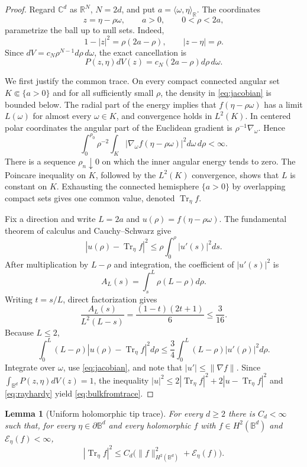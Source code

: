 \documentclass[11pt]{article}
\newtheorem{lemma}{Lemma}
\theoremstyle{remark}
\newcommand{\Bd}{\mathbb B^d}
\newcommand{\Sd}{\partial\mathbb B^d}
\newcommand{\Eeta}{\mathcal E_{\eta}}
\newcommand{\Tr}{\operatorname{Tr}}
\begin{document}
\begin{proof}
Regard $\mathbb C^d$ as $\mathbb R^N$, $N=2d$, and put
$a=\langle\omega,\eta\rangle_{\mathbb R}$.  The coordinates
\[
 z=\eta-\rho\omega,\qquad a>0,\qquad 0<\rho<2a,
\]
parametrize the ball up to null sets.  Indeed,
\[
 1-|z|^2=\rho(2a-\rho),\qquad |z-\eta|=\rho.
\]
Since $dV=c_N\rho^{N-1}d\rho\,d\omega$, the exact cancellation is
\begin{equation}\label{eq:jacobian}
 P(z,\eta)dV(z)=c_N(2a-\rho)d\rho\,d\omega.
\end{equation}

We first justify the common trace.  On every compact connected angular set
$K\Subset\{a>0\}$ and for all sufficiently small $\rho$, the density in
\eqref{eq:jacobian} is bounded below.  The radial part of the energy implies
that $f(\eta-\rho\omega)$ has a limit $L(\omega)$ for almost every
$\omega\in K$, and convergence holds in $L^2(K)$.  In centered polar
coordinates the angular part of the Euclidean gradient is
$\rho^{-1}\nabla_\omega$.  Hence
\[
 \int_0^{\rho_0}\rho^{-2}
 \int_K|\nabla_\omega f(\eta-\rho\omega)|^2d\omega\,d\rho<\infty.
\]
There is a sequence $\rho_n\downarrow0$ on which the inner angular energy
tends to zero.  The Poincare inequality on $K$, followed by the $L^2(K)$
convergence, shows that $L$ is constant on $K$.  Exhausting the connected
hemisphere $\{a>0\}$ by overlapping compact sets gives one common value,
denoted $\Tr_\eta f$.

Fix a direction and write $L=2a$ and
$u(\rho)=f(\eta-\rho\omega)$.  The fundamental theorem of calculus and
Cauchy--Schwarz give
\[
 |u(\rho)-\Tr_\eta f|^2
 \leq \rho\int_0^\rho|u'(s)|^2ds.
\]
After multiplication by $L-\rho$ and integration, the coefficient of
$|u'(s)|^2$ is
\[
 A_L(s)=\int_s^L\rho(L-\rho)d\rho.
\]
Writing $t=s/L$, direct factorization gives
\[
 \frac{A_L(s)}{L^2(L-s)}
 =\frac{(1-t)(2t+1)}6\leq\frac3{16}.
\]
Because $L\leq2$,
\begin{equation}\label{eq:rayhardy}
 \int_0^L(L-\rho)|u(\rho)-\Tr_\eta f|^2d\rho
 \leq\frac34\int_0^L(L-\rho)|u'(\rho)|^2d\rho.
\end{equation}
Integrate over $\omega$, use \eqref{eq:jacobian}, and note that
$|u'|\leq\lVert\nabla f\rVert$.  Since
$\int_{\Bd}P(z,\eta)dV(z)=1$, the inequality
$|u|^2\leq2|\Tr_\eta f|^2+2|u-\Tr_\eta f|^2$ and
\eqref{eq:rayhardy} yield \eqref{eq:bulkfromtrace}.
\end{proof}

\begin{lemma}[Uniform holomorphic tip trace]\label{lem:trace}
For every $d\geq2$ there is $C_d<\infty$ such that, for every
$\eta\in\Sd$ and every holomorphic $f$ with
$f\in H^2(\Bd)$ and $\Eeta(f)<\infty$,
\begin{equation}\label{eq:tracebound}
 |\Tr_\eta f|^2\leq C_d\bigl(\lVert f\rVert_{H^2(\Bd)}^2+\Eeta(f)\bigr).
\end{equation}
\end{lemma}
\end{document}

